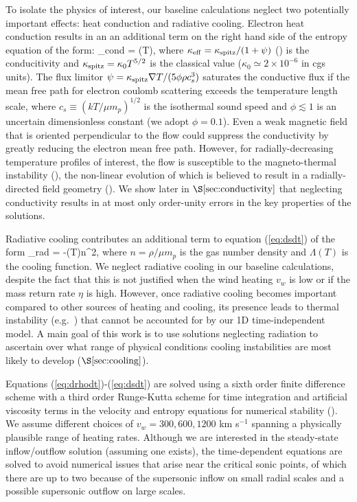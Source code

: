 \documentclass[usenatbib,fleqn]{mn2e}
\newcommand{\vwO}{v_{w}}
\begin{document}
To isolate the physics of interest, our baseline calculations neglect two potentially important effects: heat conduction and radiative cooling.  Electron heat conduction results in an an additional term on the right hand side of the entropy equation of the form:  
\be {}_{\rm cond} = \nabla\cdot(\kappa \nabla T), \ee
where $\kappa_{\rm
  eff}=\kappa_{\rm spitz}/(1+\psi)$ (\citealt{DaltonBalbus:1993a}) is
the conducitivity and $\kappa_{\rm spitz} = \kappa_0 T^{5/2}$ is the
classical \citet{Spitzer62} value ($\kappa_0\simeq 2\times 10^{-6}$ in
cgs units).  The flux limitor $\psi = \kappa_{\rm spitz} \nabla
T/(5\phi \rho c_s^3)$ saturates the conductive flux if the mean free
path for electron coulomb scattering exceeds the
temperature length scale, where $c_s \equiv (kT/\mu m_p)^{1/2}$ is the
isothermal sound speed and $\phi \lesssim 1$ is an uncertain
dimensionless constant (we adopt $\phi = 0.1$).  Even a weak magnetic
field that is oriented perpendicular to the flow could suppress the
conductivity by greatly reducing the electron mean free path.  However, for radially-decreasing temperature profiles
of interest, the flow is susceptible to the magneto-thermal instability (\citealt{Balbus01}), the non-linear evolution of which is believed to result in a radially-directed field geometry (\citealt{Parrish&Stone07}).  We show later in $\S\ref{sec:conductivity}$ that neglecting conductivity results in at most only order-unity errors in the key properties of the solutions.

Radiative cooling contributes an additional term to equation (\ref{eq:dsdt}) of the form
\be
{}_{\rm rad} = -\Lambda(T)n^{2},
\label{eq:qdot_rad}
\ee
where $n = \rho/\mu m_p$ is the gas number density and $\Lambda(T)$ is the cooling function.  We neglect radiative cooling in our baseline calculations, despite the fact that this is not justified when the wind heating $\vwO$ is low or if the mass return rate $\eta$ is high.  However, once radiative cooling becomes important compared to other sources of heating and cooling, its presence leads to thermal instability (e.g.~\citealt{McCourt+12}) that cannot be accounted for by our 1D
time-independent model.  A main goal of this work is to use solutions neglecting radiation to ascertain over what range of physical conditions cooling instabilities are most likely to develop ($\S\ref{sec:cooling}$).

Equations (\ref{eq:drhodt})-(\ref{eq:dsdt}) are solved using a sixth
order finite difference scheme with a third order Runge-Kutta scheme
for time integration and artificial viscosity terms in the velocity
and entropy equations for numerical stability
(\citealt{Brandenburg:2003a}).  We assume different
choices of $v_{w} = 300, 600, 1200$ km s$^{-1}$ spanning a
physically plausible range of heating rates.  Although we are interested in the
steady-state inflow/outflow solution (assuming one exists), the time-dependent equations are solved to avoid numerical issues that arise near the critical sonic points, of which there are up to two because of the supersonic
inflow on small radial scales and a possible supersonic outflow on large scales.
\end{document}
